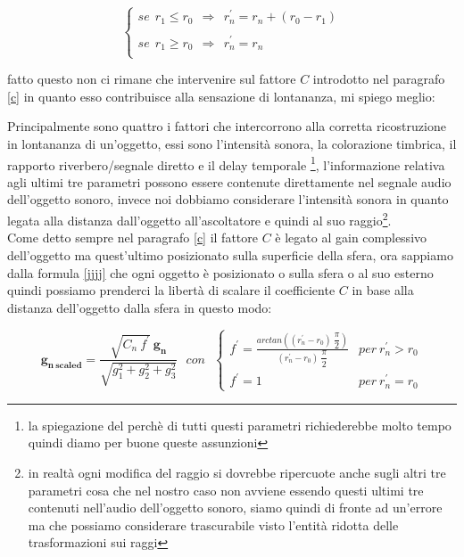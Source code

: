 \documentclass[12pt,a4paper]{report}
\begin{document}
\begin{equation}
\left\{\begin{matrix}
se\ \  r_1 \leq r_0\ \ \Rightarrow \ \ r_n^{\prime} = r_n+(r_0 - r_1) \\
\\
se\ \  r_1 \geq r_0\ \ \Rightarrow \ \ r_n^{\prime} = r_n\\
\end{matrix}\right.
\label{jjjj}
\end{equation}

fatto questo non ci rimane che intervenire sul fattore $C$ introdotto nel paragrafo \ref{c} in quanto esso contribuisce alla sensazione di lontananza, mi spiego meglio:

Principalmente sono quattro i fattori che intercorrono alla corretta ricostruzione in lontananza di un'oggetto, essi sono l'intensità sonora, la colorazione timbrica, il rapporto riverbero/segnale diretto e il delay temporale \footnote{la spiegazione del perchè di tutti questi parametri richiederebbe molto tempo quindi diamo per buone queste assunzioni}, l'informazione relativa agli ultimi tre parametri possono essere contenute direttamente nel segnale audio dell'oggetto sonoro, invece noi dobbiamo considerare l'intensità sonora in quanto legata alla distanza dall'oggetto all'ascoltatore e quindi al suo raggio\footnote{in realtà ogni modifica del raggio si dovrebbe ripercuote anche sugli altri tre parametri cosa che nel nostro caso non avviene essendo questi ultimi tre contenuti nell'audio dell'oggetto sonoro, siamo quindi di fronte ad un'errore ma che possiamo considerare trascurabile visto l'entità ridotta delle trasformazioni sui raggi }.\\

Come detto sempre nel paragrafo \ref{c} il fattore $C$ è legato al gain complessivo dell'oggetto ma quest'ultimo posizionato sulla superficie della sfera, ora sappiamo dalla formula \ref{jjjj} che ogni oggetto è posizionato o sulla sfera o al suo esterno quindi possiamo prenderci la libertà di scalare il coefficiente $C$ in base alla distanza dell'oggetto dalla sfera in questo modo:

\begin{equation}
\boldsymbol{g_{n\ scaled}} = \dfrac{\sqrt{C_n \ f^{\prime}}\ \boldsymbol{g_n}}{\sqrt{g_1^2 +g_2^2 + g_3^2}} \ \ \ con \ \ \ \left\{\begin{matrix}
f^{\prime}= \frac{arctan\left((r_n^{\prime}-r_0)\ \dfrac{\pi}{2}\right)}{(r_n^{\prime}-r_0)\ \dfrac{\pi}{2}} & per\ r_n^{\prime}>r_0
\\
f^{\prime}=1 & per\ r_n^{\prime}=r_0
\end{matrix}\right.
\label{kkkk}
\end{equation}
\end{document}
